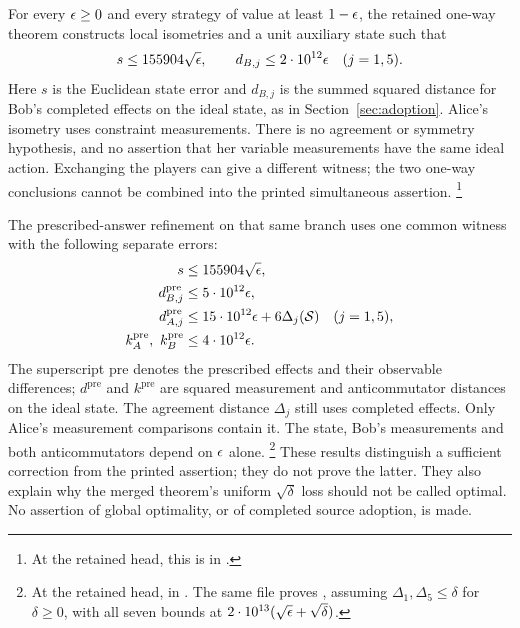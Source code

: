 \documentclass[11pt]{article}
\newcommand{\strategy}{\mathcal{S}}
\begin{document}
For every $\epsilon\ge0$ and every strategy of value at least $1-\epsilon$, the
retained one-way theorem constructs local isometries and a unit auxiliary
state such that
\[
  s\le155904\sqrt{\epsilon},\qquad
  d_{B,j}\le2\cdot10^{12}\epsilon\quad(j=1,5).
\]
Here $s$ is the Euclidean state error and $d_{B,j}$ is the summed squared
distance for Bob's completed effects on the ideal state, as in
Section~\ref{sec:adoption}. Alice's isometry uses constraint measurements.
There is no agreement or symmetry hypothesis, and no assertion that her
variable measurements have the same ideal action. Exchanging the players can
give a different witness; the two one-way conclusions cannot be combined into
the printed simultaneous assertion.%
\footnote{At the retained head, this is
in .}

The prescribed-answer refinement on that same branch uses one common witness
with the following separate errors:
\begin{align*}
  s&\le155904\sqrt\eps,\\
  d^{\mathrm{pre}}_{B,j}&\le5\cdot10^{12}\eps,\\
  d^{\mathrm{pre}}_{A,j}&\le15\cdot10^{12}\eps+6\Delta_j(\strategy)
    \quad(j=1,5),\\
  k^{\mathrm{pre}}_A,\ k^{\mathrm{pre}}_B&\le4\cdot10^{12}\eps.
\end{align*}
The superscript $\mathrm{pre}$ denotes the prescribed effects and their
observable differences; $d^{\mathrm{pre}}$ and $k^{\mathrm{pre}}$ are squared
measurement and anticommutator distances on the ideal state.
The agreement distance $\Delta_j$ still uses completed effects.
Only Alice's measurement comparisons contain it. The state, Bob's
measurements and both anticommutators depend on $\epsilon$ alone.%
\footnote{At the retained head,
in .
The same file proves
, assuming
$\Delta_1,\Delta_5\le\delta$ for $\delta\ge0$, with all seven bounds at
$2\cdot10^{13}(\sqrt{\epsilon}+\sqrt\delta)$.}
These results distinguish a sufficient correction from the printed assertion;
they do not prove the latter. They also explain why the merged theorem's
uniform $\sqrt\delta$ loss should not be called optimal. No assertion of
global optimality, or of completed source adoption, is made.
\end{document}
